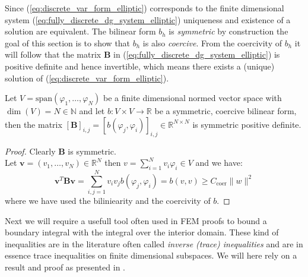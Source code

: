 Since (\ref{eq:discrete_var_form_elliptic}) corresponds to the finite dimensional
system (\ref{eq:fully_discrete_dg_system_elliptic}) uniqueness and existence of a solution
are equivalent. 
The bilinear form $b_h$ is \textit{symmetric} by construction 
the goal of this section is to show that $b_h$ is also \textit{coercive}. 
From the coercivity of $b_h$ it will follow that the matrix $\textbf{B}$ in (\ref{eq:fully_discrete_dg_system_elliptic})
is positive definite and hence invertible, which means there exists a (unique) solution
of (\ref{eq:discrete_var_form_elliptic}).
\begin{lemma}
    Let $V = \text{span}(\varphi_1,\ldots,\varphi_N)$ be a finite dimensional 
    normed vector space with $\dim(V) = N\in \mathbb{N}$ and let
    $b:V \times V \to \mathbb{R}$ be a symmetric, coercive bilinear form,
    then the matrix ${[\textbf{B}]}_{i,j} = {[b(\varphi_j, \varphi_i)]}_{i,j}\in \mathbb{R}^{N\times N}$
    is symmetric positive definite.
\end{lemma}
\begin{proof}
    Clearly $\textbf{B}$ is symmetric. \\
    Let $\textbf{v}=(v_1,\ldots,v_N)\in \mathbb{R}^N$ then $v = \sum_{i=1}^{N}
    v_i \varphi_i\in V$ and we have:
    \[
        \textbf{v}^{T}\textbf{B}\textbf{v} = \sum_{i,j=1}^{N}v_i v_j b(\varphi_j,\varphi_i) = b(v,v) \geq
        C_{\text{coer}} \|w\|^2
    \]
    where we have used the biliniearity and the coercivity of $b$.
\end{proof}
Next we will require a usefull tool often used in FEM proofs to bound
a boundary integral with the integral over the interior domain. These kind
of inequalities are in the literature often called \textit{inverse (trace) inequalities}
and are in essence trace inequalities on finite dimensional subspaces.
We will here rely on a result and proof as presented in \cite{warburtonHesthaven2003ineq}.

